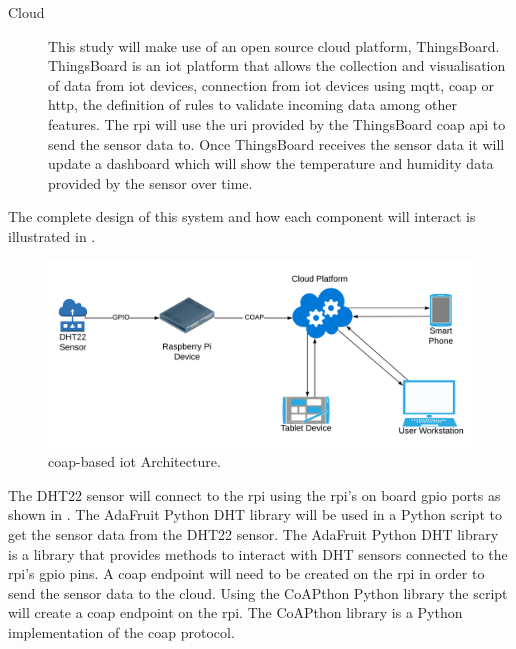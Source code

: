 \begin{description}
    \item[Cloud]
    This study will make use of an open source cloud platform, ThingsBoard.
    ThingsBoard is an \gls{iot} platform that allows the collection and 
    visualisation of data from \gls{iot} devices, connection from \gls{iot} devices
    using \gls{mqtt}, \gls{coap} or \gls{http}, the definition of rules to validate
    incoming data among other features. The \gls{rpi} will use the \gls{uri} 
    provided by the ThingsBoard \gls{coap} \gls{api} to send the sensor data to.
    Once ThingsBoard receives the sensor data it will update a dashboard which
    will show the temperature and humidity data provided by the sensor over time.

\end{description}

The complete design of this system and how each component will interact
is illustrated in .

\begin{figure}[H]
    \centering
    \includegraphics[width=\imageWidth\textwidth]{assets/Project_Framework.png}
    \caption{\label{fig:coap_iot_architecture} \gls{coap}-based \gls{iot} Architecture.}
\end{figure}

The DHT22 sensor will connect to the \gls{rpi} using the \gls{rpi}'s on board 
\gls{gpio} ports as shown in . 
The AdaFruit Python DHT library will be used in a Python script to get the 
sensor data from the DHT22 sensor.
The AdaFruit Python DHT library is a library that provides methods to interact 
with DHT sensors connected to the \gls{rpi}'s \gls{gpio} pins.
A \gls{coap} endpoint will need to be created on the \gls{rpi} in order to 
send the sensor data to the cloud. 
Using the CoAPthon Python library the script will create a \gls{coap} 
endpoint on the \gls{rpi}.
The CoAPthon library is a Python implementation of the \gls{coap} protocol.

